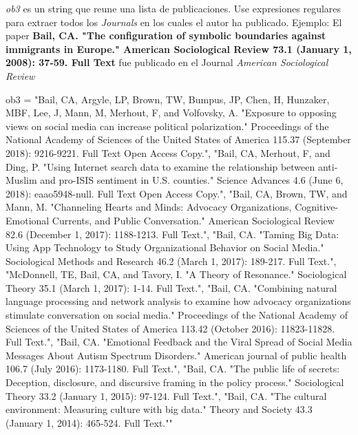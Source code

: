 \documentclass[11pt]{article}
\begin{document}
\emph{ob3} es un string que reune una lista de publicaciones. Use
expresiones regulares para extraer todos los \emph{Journals} en los
cuales el autor ha publicado. Ejemplo: El paper \textbf{Bail, CA. "The
configuration of symbolic boundaries against immigrants in Europe."
American Sociological Review 73.1 (January 1, 2008): 37-59. Full Text}
fue publicado en el Journal \emph{American Sociological Review}

ob3 = "Bail, CA, Argyle, LP, Brown, TW, Bumpus, JP, Chen, H, Hunzaker,
MBF, Lee, J, Mann, M, Merhout, F, and Volfovsky, A. "Exposure to
opposing views on social media can increase political polarization."
Proceedings of the National Academy of Sciences of the United States of
America 115.37 (September 2018): 9216-9221. Full Text Open Access
Copy.\n", "Bail, CA, Merhout, F, and Ding, P. "Using Internet search
data to examine the relationship between anti-Muslim and pro-ISIS
sentiment in U.S. counties." Science Advances 4.6 (June 6, 2018):
eaao5948-null. Full Text Open Access Copy.\n", "Bail, CA, Brown, TW, and
Mann, M. "Channeling Hearts and Minds: Advocacy Organizations,
Cognitive-Emotional Currents, and Public Conversation." American
Sociological Review 82.6 (December 1, 2017): 1188-1213. Full Text.\n",
"Bail, CA. "Taming Big Data: Using App Technology to Study
Organizational Behavior on Social Media." Sociological Methods and
Research 46.2 (March 1, 2017): 189-217. Full Text.\n", "McDonnell, TE,
Bail, CA, and Tavory, I. "A Theory of Resonance." Sociological Theory
35.1 (March 1, 2017): 1-14. Full Text.\n", "Bail, CA. "Combining natural
language processing and network analysis to examine how advocacy
organizations stimulate conversation on social media." Proceedings of
the National Academy of Sciences of the United States of America 113.42
(October 2016): 11823-11828. Full Text.\n", "Bail, CA. "Emotional
Feedback and the Viral Spread of Social Media Messages About Autism
Spectrum Disorders." American journal of public health 106.7 (July
2016): 1173-1180. Full Text.\n", "Bail, CA. "The public life of secrets:
Deception, disclosure, and discursive framing in the policy process."
Sociological Theory 33.2 (January 1, 2015): 97-124. Full Text.\n",
"Bail, CA. "The cultural environment: Measuring culture with big data."
Theory and Society 43.3 (January 1, 2014): 465-524. Full Text.""
\end{document}
